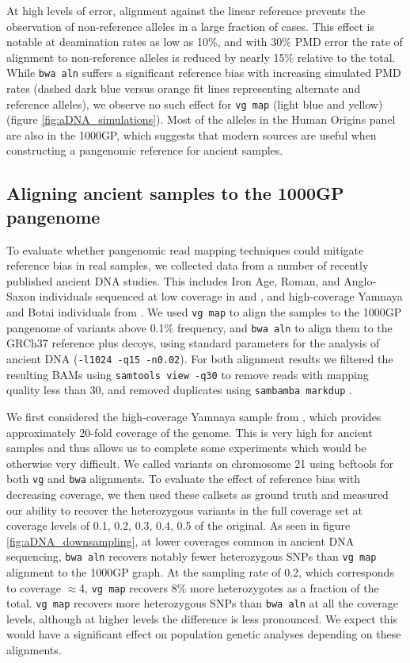 \documentclass[a4paper,12pt,numbered,oneside]{Classes/PhDThesisPSnPDF}
\begin{document}
At high levels of error, alignment against the linear reference prevents the observation of non-reference alleles in a large fraction of cases.
This effect is notable at deamination rates as low as 10\%, and with 30\% PMD error the rate of alignment to non-reference alleles is reduced by nearly 15\% relative to the total.
While {\tt bwa aln} suffers a significant reference bias with increasing simulated PMD rates (dashed dark blue versus orange fit lines representing alternate and reference alleles), we observe no such effect for {\tt vg map} (light blue and yellow) (figure \ref{fig:aDNA_simulations}).
Most of the alleles in the Human Origins panel are also in the 1000GP, which suggests that modern sources are useful when constructing a pangenomic reference for ancient samples.

\subsection{Aligning ancient samples to the 1000GP pangenome}

To evaluate whether pangenomic read mapping techniques could mitigate reference bias in real samples, we collected data from a number of recently published ancient DNA studies.
This includes Iron Age, Roman, and Anglo-Saxon individuals sequenced at low coverage in \cite{schiffels2016iron} and \cite{martiniano2016genomic}, and high-coverage Yamnaya and Botai individuals from \cite{de2018first}.
We used {\tt vg map} to align the samples to the 1000GP pangenome of variants above 0.1\% frequency, and {\tt bwa aln} to align them to the GRCh37 reference plus decoys, using standard parameters for the analysis of ancient DNA ({\tt -l1024 -q15 -n0.02}).
For both alignment results we filtered the resulting BAMs using {\tt samtools view -q30} to remove reads with mapping quality less than 30, and removed duplicates using {\tt sambamba markdup} \cite{tarasov2015sambamba}.

We first considered the high-coverage Yamnaya sample from \cite{de2018first}, which provides approximately 20-fold coverage of the genome.
This is very high for ancient samples and thus allows us to complete some experiments which would be otherwise very difficult.
We called variants on chromosome 21 using bcftools \cite{li2009sequence} for both {\tt vg} and {\tt bwa} alignments.
To evaluate the effect of reference bias with decreasing coverage, we then used these callsets as ground truth and measured our ability to recover the heterozygous variants in the full coverage set at coverage levels of 0.1, 0.2, 0.3, 0.4, 0.5 of the original.
As seen in figure \ref{fig:aDNA_downsampling}, at lower coverages common in ancient DNA sequencing, {\tt bwa aln} recovers notably fewer heterozygous SNPs than {\tt vg map} alignment to the 1000GP graph.
At the sampling rate of 0.2, which corresponds to coverage $\approx$4, {\tt vg map} recovers 8\% more heterozygotes as a fraction of the total.
{\tt vg map} recovers more heterozygous SNPs than {\tt bwa aln} at all the coverage levels, although at higher levels the difference is less pronounced.
We expect this would have a significant effect on population genetic analyses depending on these alignments.
\end{document}
